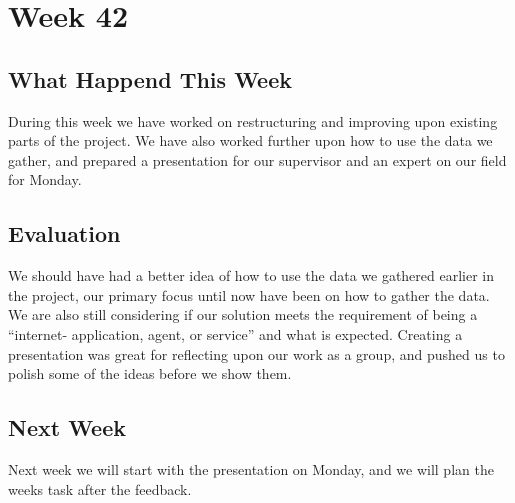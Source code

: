 \section*{Week 42}
\subsection*{What Happend This Week}
During this week we have worked on restructuring and improving upon existing
parts of the project. We have also worked further upon how to use the data we
gather, and prepared a presentation for our supervisor and an expert on our
field for Monday. 

\subsection*{Evaluation}
We should have had a better idea of how to use the data we gathered earlier in
the project, our primary focus until now have been on how to gather the data. We
are also still considering if our solution meets the requirement of being a
``internet- application, agent, or service'' and what is expected. Creating a
presentation was great for reflecting upon our work as a group, and pushed us to
polish some of the ideas before we show them.

\subsection*{Next Week}
Next week we will start with the presentation on Monday, and we will plan the
weeks task after the feedback.




